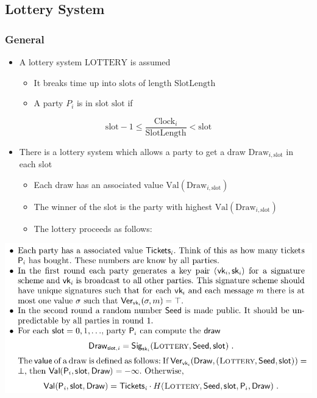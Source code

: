 \documentclass[11pt]{article}
\begin{document}
\subsection{Lottery System}
\label{sec:org283bcac}
\subsubsection{General}
\label{sec:orgea270f1}
\begin{itemize}
\item A lottery system \(\text{LOTTERY}\) is assumed
\begin{itemize}
\item It breaks time up into \(\text{slots}\) of length \(\text{SlotLength}\)
\item A party \(P_i\) is in slot \(\text{slot}\) if
\end{itemize}
\end{itemize}
\begin{equation}
  \text{slot}-1 \leq \frac{\text{Clock}_i}{\text{SlotLength}} < \text{slot}
\end{equation}

\begin{itemize}
\item There is a lottery system which allows a party to get a draw \(\text{Draw}_{i,\text{slot}}\) in each slot
\begin{itemize}
\item Each draw has an associated value \(\text{Val}(\text{Draw}_{i,\text{slot}})\)
\item The winner of the slot is the party with highest \(\text{Val}(\text{Draw}_{i,\text{slot}})\)
\item The lottery proceeds as follows:
\end{itemize}
\end{itemize}
\begin{center}
\includegraphics[width=.9\linewidth]{Blockchains/screenshot_2018-10-28_08-52-47.png}
\end{center}
\end{document}

